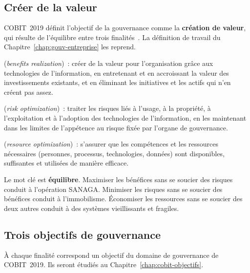 \subsection{Créer de la valeur}

COBIT~2019 définit l'objectif de la gouvernance comme la \textbf{création
de valeur}, qui résulte de l'équilibre entre trois
finalités~\cite{isaca2018cobitintro}. La définition de travail du
Chapitre~\ref{chap:gouv-entreprise} les reprend.

\begin{boxdef}
(\textit{benefits realization})~: créer de la valeur pour l'organisation
grâce aux technologies de l'information, en entretenant et en accroissant
la valeur des investissements existants, et en éliminant les initiatives
et les actifs qui n'en créent pas assez.

\medskip
{}
(\textit{risk optimization})~: traiter les risques liés à l'usage, à la
propriété, à l'exploitation et à l'adoption des technologies de
l'information, en les maintenant dans les limites de l'appétence au
risque fixée par l'organe de gouvernance.

\medskip
{} (\textit{resource optimization})~: s'assurer que les
compétences et les ressources nécessaires (personnes, processus,
technologies, données) sont disponibles, suffisantes et utilisées de
manière efficace.
\end{boxdef}

Le mot clé est \textbf{équilibre}. Maximiser les bénéfices sans se soucier
des risques conduit à l'opération SANAGA. Minimiser les risques sans se
soucier des bénéfices conduit à l'immobilisme. Économiser les ressources
sans se soucier des deux autres conduit à des systèmes vieillissants et
fragiles.

\subsection{Trois objectifs de gouvernance}

À chaque finalité correspond un objectif du domaine de gouvernance de
COBIT~2019. Ils seront étudiés au Chapitre~\ref{chap:cobit-objectifs}.

